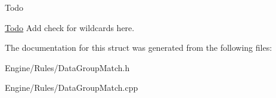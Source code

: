 \begin{DoxyRefDesc}{Todo}
\item[\hyperlink{todo__todo000003}{Todo}]Add check for wildcards here. \end{DoxyRefDesc}


The documentation for this struct was generated from the following files\+:\begin{DoxyCompactItemize}
\item 
Engine/\+Rules/Data\+Group\+Match.\+h\item 
Engine/\+Rules/Data\+Group\+Match.\+cpp\end{DoxyCompactItemize}
